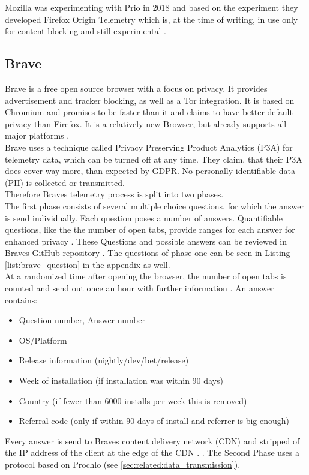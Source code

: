         
        
    
        Mozilla was experimenting with Prio in 2018  \cite{helmer_testing_2018} and based on the experiment they developed Firefox Origin Telemetry  \cite{englehardt_next_2019} which is, at the time of writing, in use only for content blocking and still     experimental \cite{noauthor_origin_nodate}.\\
    
    
    \subsection{Brave}
        Brave is a free open source browser with a focus on privacy. It provides advertisement and tracker blocking, as well as a Tor integration. It is based on Chromium and promises to be faster than it and claims to have better default privacy than Firefox. It is a relatively new Browser, but already supports all major platforms \cite{brave_secure_nodate}.\\
        Brave uses a technique called Privacy Preserving Product Analytics (P3A) for telemetry data, which can be turned off at any time.
        They claim, that their P3A does cover way more, than expected by GDPR. No personally identifiable data (PII) is collected or transmitted.\\
        Therefore Braves telemetry process is split into two phases.\\
        The first phase consists of several multiple choice questions, for which the answer is send individually.
        Each question poses a number of answers. Quantifiable questions, like the the number of open tabs, provide ranges for each answer for enhanced privacy \cite{brave_privacy-preserving_2019}. These Questions and possible answers can be reviewed in Braves GitHub repository \cite{brave_software_inc_brave-browser_2019}.
        The questions of phase one can be seen in Listing \ref{list:brave_question} in the appendix as well.\\
        At a randomized time after opening the browser, the number of open tabs is counted and send out once an hour with further information \cite{brave_privacy-preserving_2019}.
        An answer contains:
        \begin{itemize}
            \item Question number, Answer number
            \item OS/Platform
            \item Release information (nightly/dev/bet/release)
            \item Week of installation (if installation was within 90 days)
            \item Country (if fewer than 6000 installs per week this is removed)
            \item Referral code (only if within 90 days of install and referrer is big enough)
        \end{itemize}
        Every answer is send to Braves content delivery network (CDN) and stripped of the IP address of the client at the edge of the CDN \cite{brave_privacy-preserving_2019}.
        . 
        The Second Phase uses a protocol based on Prochlo (see \ref{sec:related:data_transmission}). 
        
